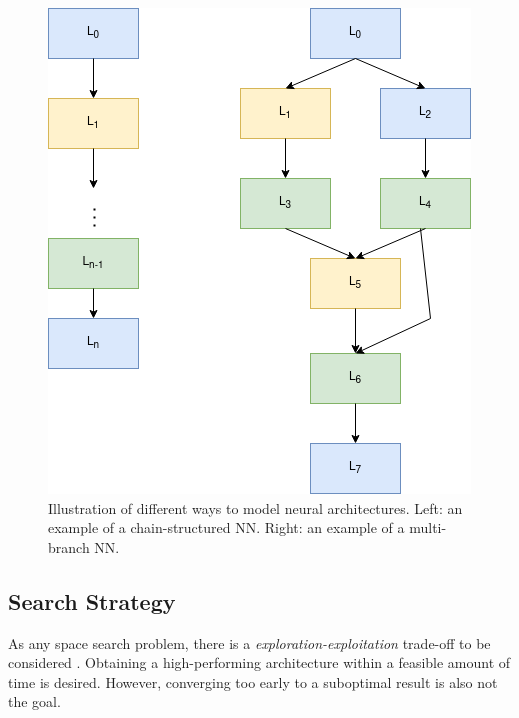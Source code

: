 \documentclass[10pt,        %
               a4paper,     %
               journal,     %
               ]{IEEEtran}
\begin{document}
\begin{figure}[!t]
    \centering
    \includegraphics[scale=0.4]{space}
    \caption{Illustration of different ways to model neural architectures. Left: an example of a chain-structured NN.
             Right: an example of a multi-branch NN.}
    \label{space}
\end{figure}


\subsection{Search Strategy}
As any space search problem, there is a \textit{exploration-exploitation} trade-off to be considered \cite{elsken2019neural}.
Obtaining a high-performing architecture within a feasible amount of time is desired. However, converging too early to a
suboptimal result is also not the goal.
\end{document}
